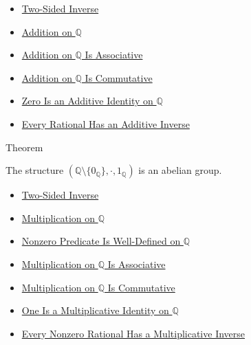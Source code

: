 \begin{dependencies}
\begin{itemize}
  \item \hyperref[def:two-sided-inverse]{Two-Sided Inverse}
  \item \hyperref[def:addition-on-q-classes]{Addition on $\mathbb{Q}$}
  \item \hyperref[thm:addition-on-q-associative]{Addition on $\mathbb{Q}$ Is Associative}
  \item \hyperref[thm:addition-on-q-commutative]{Addition on $\mathbb{Q}$ Is Commutative}
  \item \hyperref[thm:zero-additive-identity-on-q]{Zero Is an Additive Identity on $\mathbb{Q}$}
  \item \hyperref[thm:every-rational-has-additive-inverse]{Every Rational Has an Additive Inverse}
\end{itemize}
\end{dependencies}

\begin{theorembox}{Theorem}
\begin{theorem}
\label{thm:q-nonzero-multiplicative-abelian-group}
The structure
$(\mathbb{Q}\setminus\{0_{\mathbb{Q}}\},\cdot,1_{\mathbb{Q}})$ is an abelian
group.
\end{theorem}
\end{theorembox}

\begin{dependencies}
\begin{itemize}
  \item \hyperref[def:two-sided-inverse]{Two-Sided Inverse}
  \item \hyperref[def:multiplication-on-q-classes]{Multiplication on $\mathbb{Q}$}
  \item \hyperref[lem:nonzero-predicate-well-defined-q]{Nonzero Predicate Is Well-Defined on $\mathbb{Q}$}
  \item \hyperref[thm:multiplication-on-q-associative]{Multiplication on $\mathbb{Q}$ Is Associative}
  \item \hyperref[thm:multiplication-on-q-commutative]{Multiplication on $\mathbb{Q}$ Is Commutative}
  \item \hyperref[thm:one-multiplicative-identity-on-q]{One Is a Multiplicative Identity on $\mathbb{Q}$}
  \item \hyperref[thm:every-nonzero-rational-has-multiplicative-inverse]{Every Nonzero Rational Has a Multiplicative Inverse}
\end{itemize}
\end{dependencies}

